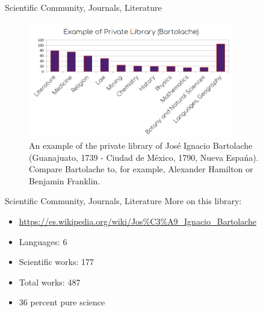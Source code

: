 \documentclass{beamer}
\begin{document}
\begin{frame}{Scientific Community, Journals, Literature}
\small
\begin{figure}
\centering
\includegraphics[width=0.8\textwidth]{figures/library1.png}
\caption{\label{fig:library} An example of the private library of Jos\'{e} Ignacio Bartolache (Guanajuato, 1739 - Ciudad de M\'{e}xico, 1790, Nueva Espa\'{n}a). Compare Bartolache to, for example, Alexander Hamilton or Benjamin Franklin.}
\end{figure}
\end{frame}

\begin{frame}{Scientific Community, Journals, Literature}
More on this library:
\begin{itemize}
\item \url{https://es.wikipedia.org/wiki/Jos\%C3\%A9_Ignacio_Bartolache}
\item Languages: 6
\item Scientific works: 177
\item Total works: 487
\item 36 percent pure science
\end{itemize}
\end{frame}
\end{document}
